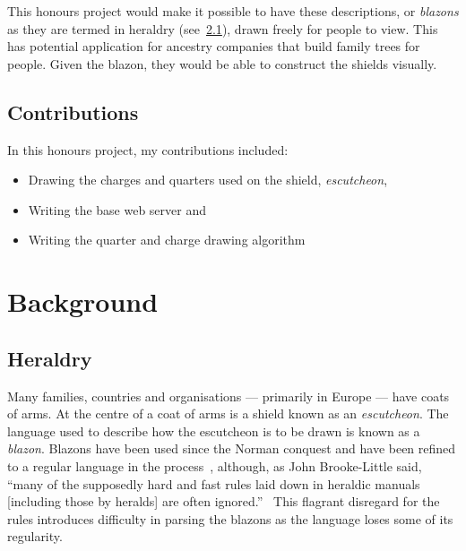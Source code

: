 \documentclass[nobib, a4paper, twoside, justified]{tufte-book}
\begin{document}
This honours project would make it possible to have these descriptions, or \textit{blazons} as they
are termed in heraldry (see~\ref{sec:heraldry}), drawn freely for people to view. This has
potential application for ancestry companies that build family trees for people. Given the blazon,
they would be able to construct the shields visually.

\section{Contributions}\label{sec:contributions}

In this honours project, my contributions included:

\begin{itemize}
  \item Drawing the charges and quarters used on the shield, \textit{escutcheon},
  \item Writing the base web server and
  \item Writing the quarter and charge drawing algorithm
\end{itemize}

\chapter{Background}\label{cha:background}

\section{Heraldry}\label{sec:heraldry}

Many families, countries and organisations --- primarily in Europe --- have coats of arms. At the
centre of a coat of arms is a shield known as an \textit{escutcheon}. The language used to describe
how the escutcheon is to be drawn is known as a \textit{blazon}. Blazons have been used since the
Norman conquest and have been refined to a regular language in the process~\autocite{boutell_1864},
although, as John Brooke-Little said, ``many of the supposedly hard and fast rules laid down in
heraldic manuals [including those by heralds] are often ignored.''~\autocite{brooke_little_1985}
This flagrant disregard for the rules introduces difficulty in parsing the blazons as the language
loses some of its regularity.
\end{document}
